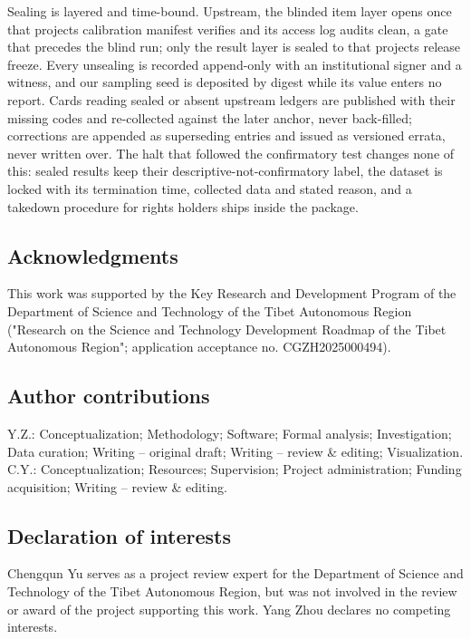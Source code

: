 \documentclass[
  english,
]{article}
\begin{document}
Sealing is layered and time-bound. Upstream, the blinded item layer opens once that project\textquotesingle s calibration manifest verifies and its access log audits clean, a gate that precedes the blind run; only the result layer is sealed to that project\textquotesingle s release freeze. Every unsealing is recorded append-only with an institutional signer and a witness, and our sampling seed is deposited by digest while its value enters no report. Cards reading sealed or absent upstream ledgers are published with their missing codes and re-collected against the later anchor, never back-filled; corrections are appended as superseding entries and issued as versioned errata, never written over. The halt that followed the confirmatory test changes none of this: sealed results keep their descriptive-not-confirmatory label, the dataset is locked with its termination time, collected data and stated reason, and a takedown procedure for rights holders ships inside the package.

\subsection{Acknowledgments}\label{acknowledgments}

This work was supported by the Key Research and Development Program of the Department of Science and Technology of the Tibet Autonomous Region ("Research on the Science and Technology Development Roadmap of the Tibet Autonomous Region"; application acceptance no. CGZH2025000494).

\subsection{Author contributions}\label{author-contributions}

Y.Z.: Conceptualization; Methodology; Software; Formal analysis; Investigation; Data curation; Writing -- original draft; Writing -- review \& editing; Visualization. C.Y.: Conceptualization; Resources; Supervision; Project administration; Funding acquisition; Writing -- review \& editing.

\subsection{Declaration of interests}\label{declaration-of-interests}

Chengqun Yu serves as a project review expert for the Department of Science and Technology of the Tibet Autonomous Region, but was not involved in the review or award of the project supporting this work. Yang Zhou declares no competing interests.
\end{document}
